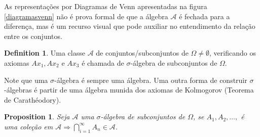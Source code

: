 \documentclass[
]{article}
\newtheorem{proposition}{Proposition}[section]
\theoremstyle{definition}
\newtheorem{definition}{Definition}[section]
\theoremstyle{definition}
\theoremstyle{definition}
\theoremstyle{definition}
\theoremstyle{remark}
\begin{document}

As representações por Diagramas de Venn apresentadas na figura \ref{diagramasvenn} não é prova formal de que a álgebra \(\mathcal{A}\) é fechada para a diferença, mas é um recurso visual que pode auxiliar no entendimento da relação entre os conjuntos.

\begin{definition}
Uma classe \(\mathcal{A}\) de conjuntos/subconjuntos de \(\Omega \neq \emptyset\), verificando os axiomas \(Ax_{1}, Ax_{2} \text{ e } Ax_{3}\) é chamada de \(\sigma\)-álgebra de subconjuntos de \(\Omega\).
\end{definition}

Note que uma \(\sigma\)-álgebra é sempre uma álgebra. Uma outra forma de construir \(\sigma\)-álgebras é partir de uma álgebra munida dos axiomas de Kolmogorov (Teorema de Carathéodory).

\begin{proposition}
Seja \(\mathcal{A}\) uma \(\sigma\)-álgebra de subconjuntos de \(\Omega\), se \(A_{1}, A_{2},\dots,\) é uma coleção em \(\mathcal{A} \Rightarrow \bigcap_{i=1}^{\infty}A_{n} \in \mathcal{A}\).
\end{proposition}
\end{document}
